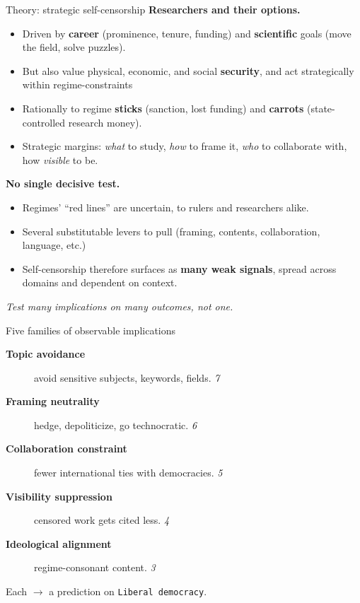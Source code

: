 \documentclass[aspectratio=169,11pt]{beamer}
\newcommand{\key}[1]{\textcolor{agentblue}{\textbf{#1}}}
\begin{document}
\begin{frame}{Theory: strategic self-censorship}
  \small
  \textbf{Researchers and their options.}
  \begin{itemize}
    \item Driven by \key{career} (prominence, tenure, funding) and \key{scientific}
          goals (move the field, solve puzzles).
    \item But also value physical, economic, and social \key{security}, and 
          act strategically within regime-constraints
    \item Rationally to regime \key{sticks} (sanction, lost funding) and
          \key{carrots} (state-controlled research money).
    \item Strategic margins: \emph{what} to study, \emph{how} to frame it,
          \emph{who} to collaborate with, how \emph{visible} to be.
  \end{itemize}
  \vspace{0.3em}
  \textbf{No single decisive test.}
  \begin{itemize}
    \item Regimes' ``red lines'' are uncertain, to rulers and researchers alike.
		\item Several substitutable levers to pull (framing, contents, collaboration, language, etc.)
    \item Self-censorship therefore surfaces as \key{many weak signals}, spread across
          domains and dependent on context.
  \end{itemize}
  \vspace{0.2em}
  \centering\itshape\color{agentblue} Test many implications on many outcomes, not one.
\end{frame}

\begin{frame}{Five families of observable implications}
  \small
  \begin{description}
    \item[\key{Topic avoidance}] avoid sensitive subjects, keywords, fields. \hfill\textit{7}
    \item[\key{Framing neutrality}] hedge, depoliticize, go technocratic. \hfill\textit{6}
    \item[\key{Collaboration constraint}] fewer international ties with democracies. \hfill\textit{5}
    \item[\key{Visibility suppression}] censored work gets cited less. \hfill\textit{4}
    \item[\key{Ideological alignment}] regime-consonant content. \hfill\textit{3}
  \end{description}
  \vspace{0.8em}
  \centering Each $\rightarrow$ a prediction on \texttt{Liberal democracy}.
\end{frame}
\end{document}
